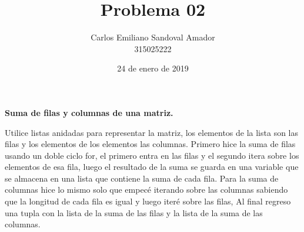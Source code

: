 \documentclass[letterpaper, 12pt, oneside]{article}%
\title{Problema 02}
\author{Carlos Emiliano Sandoval Amador \\ 315025222}
\date{24 de enero de 2019}
\begin{document}
	\maketitle
	\begin{center}
		\textbf{\large Suma de filas y columnas de una matriz.}
	\end{center}
	Utilice listas anidadas para representar la matriz, los elementos de la lista son las filas y los elementos de los elementos las columnas. Primero hice la suma de filas usando un doble ciclo for, el primero entra en las filas y el segundo itera sobre los elementos de esa fila, luego el resultado de la suma se guarda en una variable que se almacena en una lista que contiene la suma de cada fila. Para la suma de columnas hice lo mismo solo que empecé iterando sobre las columnas sabiendo que la longitud de cada fila es igual y luego iteré sobre las filas, Al final regreso una tupla con la lista de la suma de las filas y la lista de la suma de las columnas.
\end{document}
